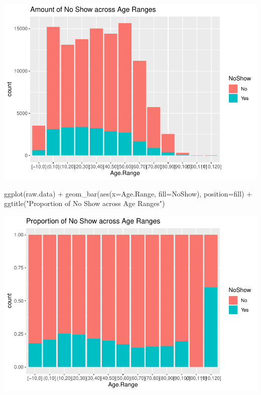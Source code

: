 \documentclass[
]{article}
\newenvironment{Shaded}{\begin{snugshade}}{\end{snugshade}}
\newcommand{\AttributeTok}[1]{\textcolor[rgb]{0.77,0.63,0.00}{#1}}
\newcommand{\FunctionTok}[1]{\textcolor[rgb]{0.00,0.00,0.00}{#1}}
\newcommand{\NormalTok}[1]{#1}
\newcommand{\SpecialCharTok}[1]{\textcolor[rgb]{0.00,0.00,0.00}{#1}}
\newcommand{\StringTok}[1]{\textcolor[rgb]{0.31,0.60,0.02}{#1}}
\begin{document}
\begin{center}\includegraphics{lab1_medical_databases_files/figure-latex/unnamed-chunk-7-1} \end{center}

\begin{Shaded}
\begin{Highlighting}[]
\FunctionTok{ggplot}\NormalTok{(raw.data) }\SpecialCharTok{+} 
  \FunctionTok{geom\_bar}\NormalTok{(}\FunctionTok{aes}\NormalTok{(}\AttributeTok{x=}\NormalTok{Age.Range, }\AttributeTok{fill=}\NormalTok{NoShow), }\AttributeTok{position=}\StringTok{\textquotesingle{}fill\textquotesingle{}}\NormalTok{) }\SpecialCharTok{+} 
  \FunctionTok{ggtitle}\NormalTok{(}\StringTok{"Proportion of No Show across Age Ranges"}\NormalTok{)}
\end{Highlighting}
\end{Shaded}

\begin{center}\includegraphics{lab1_medical_databases_files/figure-latex/unnamed-chunk-7-2} \end{center}
\end{document}
